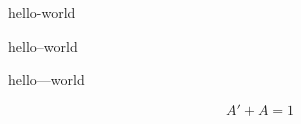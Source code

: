 \documentclass{article}
\begin{document}
hello-world

hello--world

hello---world

\[ A' + A = 1 \]
\end{document}
